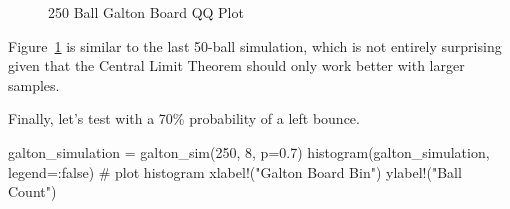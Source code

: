 \documentclass[
  letterpaper,
  DIV=11,
  numbers=noendperiod]{scrartcl}
\newenvironment{Shaded}{\begin{snugshade}}{\end{snugshade}}
\newcommand{\CommentTok}[1]{\textcolor[rgb]{0.37,0.37,0.37}{#1}}
\newcommand{\ConstantTok}[1]{\textcolor[rgb]{0.56,0.35,0.01}{#1}}
\newcommand{\FloatTok}[1]{\textcolor[rgb]{0.68,0.00,0.00}{#1}}
\newcommand{\FunctionTok}[1]{\textcolor[rgb]{0.28,0.35,0.67}{#1}}
\newcommand{\NormalTok}[1]{\textcolor[rgb]{0.00,0.23,0.31}{#1}}
\newcommand{\OperatorTok}[1]{\textcolor[rgb]{0.37,0.37,0.37}{#1}}
\newcommand{\StringTok}[1]{\textcolor[rgb]{0.13,0.47,0.30}{#1}}
\begin{document}
\begin{figure}[H]


\caption{\label{fig-galton-qq-2}250 Ball Galton Board QQ Plot}

\end{figure}%

Figure~\ref{fig-galton-qq-2} is similar to the last 50-ball simulation,
which is not entirely surprising given that the Central Limit Theorem
should only work better with larger samples.

Finally, let's test with a 70\% probability of a left bounce.

\begin{Shaded}
\begin{Highlighting}[]
\NormalTok{galton\_simulation }\OperatorTok{=} \FunctionTok{galton\_sim}\NormalTok{(}\FloatTok{250}\NormalTok{, }\FloatTok{8}\NormalTok{, p}\OperatorTok{=}\FloatTok{0.7}\NormalTok{)}
\FunctionTok{histogram}\NormalTok{(galton\_simulation, legend}\OperatorTok{=:}\ConstantTok{false}\NormalTok{) }\CommentTok{\# plot histogram}
\FunctionTok{xlabel!}\NormalTok{(}\StringTok{"Galton Board Bin"}\NormalTok{)}
\FunctionTok{ylabel!}\NormalTok{(}\StringTok{"Ball Count"}\NormalTok{)}
\end{Highlighting}
\end{Shaded}
\end{document}
